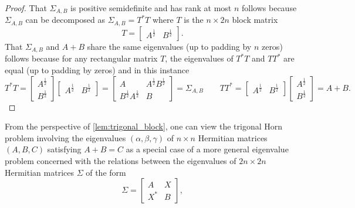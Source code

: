 \documentclass[notitlepage, 10pt]{article}
\begin{document}
\begin{proof}
    That $\Sigma_{A,B}$ is positive semidefinite and has rank at most $n$ follows because $\Sigma_{A,B}$ can be decomposed as $\Sigma_{A,B} = T^{*} T$ where $T$ is the $n \times 2n$ block matrix
    \begin{equation}
        T = \begin{bmatrix} A^{\frac{1}{2}} & B^{\frac{1}{2}} \end{bmatrix}.
    \end{equation}
    That $\Sigma_{A,B}$ and $A+B$ share the same eigenvalues (up to padding by $n$ zeros) follows because for any rectangular matrix $T$, the eigenvalues of $T^{*}T$ and $TT^{*}$ are equal (up to padding by zeros) and in this instance
    \begin{equation}
        T^{*}T = 
        \begin{bmatrix} A^{\frac{1}{2}} \\ B^{\frac{1}{2}} \end{bmatrix}
        \begin{bmatrix} A^{\frac{1}{2}} & B^{\frac{1}{2}} \end{bmatrix}
        =
        \begin{bmatrix}
            A & A^{\frac{1}{2}}B^{\frac{1}{2}} \\
            B^{\frac{1}{2}}A^{\frac{1}{2}} & B
        \end{bmatrix}
        = \Sigma_{A,B}
        \qquad
        TT^{*} = 
        \begin{bmatrix} A^{\frac{1}{2}} & B^{\frac{1}{2}} \end{bmatrix}
        \begin{bmatrix} A^{\frac{1}{2}} \\ B^{\frac{1}{2}} \end{bmatrix}
        = A + B.
    \end{equation}
\end{proof}
From the perspective of \cref{lem:trigonal_block}, one can view the trigonal Horn problem involving the eigenvalues $(\alpha,\beta,\gamma)$ of $n\times n$ Hermitian matrices $(A,B,C)$ satisfying $A+B=C$ as a special case of a more general eigenvalue problem concerned with the relations between the eigenvalues of $2n \times 2n$ Hermitian matrices $\Sigma$ of the form
\begin{equation}
    \label{eq:block_ABX}
    \Sigma = \begin{bmatrix}
        A & X \\
        X^{*} & B
    \end{bmatrix},
\end{equation}
\end{document}
